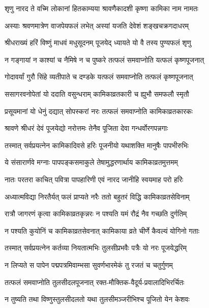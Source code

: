 
\twolineshloka
{शृणु नारद ते वच्मि लोकानां हितकाम्यया}
{श्रावणैकादशी कृष्णा कामिका नाम नामतः}%

\twolineshloka
{अस्याः श्रवणमात्रेण वाजपेयफलं लभेत्}
{अस्यां यजति देवेशं शङ्खचक्रगदाधरम्}%

\twolineshloka
{श्रीधराख्यं हरिं विष्णुं माधवं मधुसूदनम्}
{पूजयेद् ध्यायते यो वै तस्य पुण्यफलं शृणु}%

\twolineshloka
{न गङ्गायां न काश्यां च नैमिषे न च पुष्करे}
{तत्फलं समवाप्नोति यत्फलं कृष्णपूजनात्}%

\twolineshloka
{गोदावर्यां गुरौ सिंहे व्यतीपाते च दण्डके}
{यत्फलं समवाप्नोति तत्फलं कृष्णपूजनात्}%

\twolineshloka
{ससागरवनोपेतां यो ददाति वसुन्धराम्}
{कामिकाव्रतकारी च ह्युभौ समफलौ स्मृतौ}%

\twolineshloka
{प्रसूयमानां यो धेनुं दद्यात् सोपस्करां नरः}
{तत्फलं समवाप्नोति कामिकाव्रतकारकः}%

\twolineshloka
{श्रावणे श्रीधरं देवं पूजयेद्यो नरोत्तमः}
{तेनैव पूजिता देवा गन्धर्वोरगपन्नगाः}%

\twolineshloka
{तस्मात् सर्वप्रयत्नेन कामिकादिवसे हरिः}
{पूजनीयो यथाशक्ति मानुषैः पापभीरुभिः}%

\twolineshloka
{ये संसारार्णवे मग्नाः पापपङ्कसमाकुले}
{तेषामुद्धरणार्थाय कामिकाव्रतमुत्तमम्}%

\twolineshloka
{नातः परतरा काचित् पवित्रा पापहारिणी}
{एवं नारद जानीहि स्वयमाह परो हरिः}%

\twolineshloka
{अध्यात्मविद्या निरतैर्यत् फलं प्राप्यते नरैः}
{ततो बहुतरं विद्धि कामिकाव्रतसेविनाम्}%

\twolineshloka
{रात्रौ जागरणं कृत्वा कामिकाव्रतकृन्नरः}
{न पश्यति यमं रौद्रं नैव गच्छति दुर्गतिम्}%

\twolineshloka
{न पश्यति कुयोनिं च कामिकाव्रतसेवनात्}
{कामिकाया व्रते चीर्णे कैवल्यं योगिनो गताः}%

\twolineshloka
{तस्मात् सर्वप्रयत्नेन कर्तव्या नियतात्मभिः}
{तुलसीप्रभवैः पत्रैः यो नरः पूजयेद्धरिम्}%

\twolineshloka
{न लिप्यते स पापेन पद्मपत्रमिवाम्भसा}
{सुवर्णभारमेकं तु रजतं च चतुर्गुणम्}%

\twolineshloka
{तत्फलं समवाप्नोति तुलसीदलपूजनात्}
{रक्त-मौक्तिक-वैदूर्य-प्रवालादिभिरर्चितः}%

\twolineshloka
{न तुष्यति तथा विष्णुस्तुलसीदलतो यथा}
{तुलसीमञ्जरीभिश्च पूजितो येन केशवः}%

